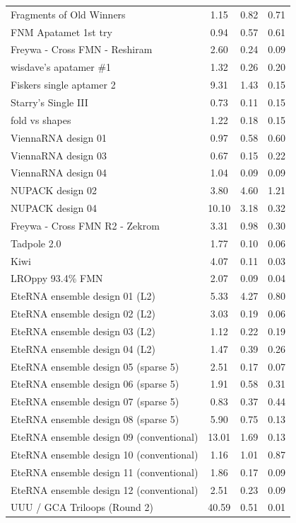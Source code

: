 \documentclass[letter]{bioinfo}
\begin{document}
\begin{center}
\begin{longtable}{l ccc}
Fragments of Old Winners		&1.15	&0.82	&0.71 \\
FNM Apatamet 1st try			&0.94 	&0.57 	&0.61 \\
Freywa - Cross FMN - Reshiram	&2.60 	&0.24 	&0.09 \\
wisdave's apatamer \#1			&1.32 	&0.26 	&0.20 \\
Fiskers single aptamer 2		&9.31 	&1.43 	&0.15 \\
Starry's Single III			&0.73 	&0.11 	&0.15 \\
fold vs shapes				&1.22 	&0.18 	&0.15 \\
ViennaRNA design 01			&0.97 	&0.58 	&0.60 \\
ViennaRNA design 03			&0.67 	&0.15 	&0.22 \\
ViennaRNA design 04			&1.04 	&0.09 	&0.09 \\
NUPACK design 02				&3.80 	&4.60 	&1.21 \\
NUPACK design 04				&10.10 	&3.18 	&0.32 \\
Freywa - Cross FMN R2 - Zekrom	&3.31	&0.98 	&0.30 \\
Tadpole 2.0					&1.77 	&0.10 	&0.06 \\
Kiwi							&4.07 	&0.11 	&0.03 \\
LROppy 93.4\% FMN				&2.07 	&0.09 	&0.04 \\
EteRNA ensemble design 01 (L2)	&5.33 	&4.27 	&0.80 \\
EteRNA ensemble design 02 (L2)	&3.03 	&0.19 	&0.06 \\
EteRNA ensemble design 03 (L2)	&1.12 	&0.22 	&0.19 \\
EteRNA ensemble design 04 (L2)	&1.47 	&0.39 	&0.26 \\
EteRNA ensemble design 05 (sparse 5)		&2.51 	&0.17 	&0.07 \\
EteRNA ensemble design 06 (sparse 5)		&1.91 	&0.58 	&0.31 \\
EteRNA ensemble design 07 (sparse 5)		&0.83 	&0.37 	&0.44 \\
EteRNA ensemble design 08 (sparse 5)		&5.90 	&0.75 	&0.13 \\
EteRNA ensemble design 09 (conventional)		&13.01 	&1.69 	&0.13 \\
EteRNA ensemble design 10 (conventional)		&1.16 	&1.01 	&0.87 \\
EteRNA ensemble design 11 (conventional)		&1.86 	&0.17 	&0.09 \\
EteRNA ensemble design 12 (conventional)		&2.51 	&0.23 	&0.09 \\
UUU / GCA Triloops (Round 2)	&40.59 	&0.51 	&0.01 \\

\end{longtable}
\end{center}
\end{document}
